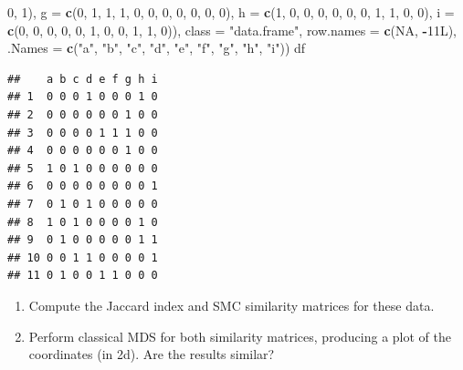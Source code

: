 \documentclass[]{book}
\newenvironment{Shaded}{\begin{snugshade}}{\end{snugshade}}
\newcommand{\DataTypeTok}[1]{\textcolor[rgb]{0.13,0.29,0.53}{#1}}
\newcommand{\DecValTok}[1]{\textcolor[rgb]{0.00,0.00,0.81}{#1}}
\newcommand{\KeywordTok}[1]{\textcolor[rgb]{0.13,0.29,0.53}{\textbf{#1}}}
\newcommand{\NormalTok}[1]{#1}
\newcommand{\OperatorTok}[1]{\textcolor[rgb]{0.81,0.36,0.00}{\textbf{#1}}}
\newcommand{\OtherTok}[1]{\textcolor[rgb]{0.56,0.35,0.01}{#1}}
\newcommand{\StringTok}[1]{\textcolor[rgb]{0.31,0.60,0.02}{#1}}
\theoremstyle{definition}
\theoremstyle{definition}
\theoremstyle{definition}
\theoremstyle{remark}
\begin{document}
\begin{Shaded}
\begin{Highlighting}[]
\DecValTok{0}\NormalTok{, }\DecValTok{1}\NormalTok{), }\DataTypeTok{g =} \KeywordTok{c}\NormalTok{(}\DecValTok{0}\NormalTok{, }\DecValTok{1}\NormalTok{, }\DecValTok{1}\NormalTok{, }\DecValTok{1}\NormalTok{, }\DecValTok{0}\NormalTok{, }\DecValTok{0}\NormalTok{, }\DecValTok{0}\NormalTok{, }\DecValTok{0}\NormalTok{, }\DecValTok{0}\NormalTok{, }\DecValTok{0}\NormalTok{, }\DecValTok{0}\NormalTok{), }\DataTypeTok{h =} \KeywordTok{c}\NormalTok{(}\DecValTok{1}\NormalTok{, }\DecValTok{0}\NormalTok{, }\DecValTok{0}\NormalTok{, }
\DecValTok{0}\NormalTok{, }\DecValTok{0}\NormalTok{, }\DecValTok{0}\NormalTok{, }\DecValTok{0}\NormalTok{, }\DecValTok{1}\NormalTok{, }\DecValTok{1}\NormalTok{, }\DecValTok{0}\NormalTok{, }\DecValTok{0}\NormalTok{), }\DataTypeTok{i =} \KeywordTok{c}\NormalTok{(}\DecValTok{0}\NormalTok{, }\DecValTok{0}\NormalTok{, }\DecValTok{0}\NormalTok{, }\DecValTok{0}\NormalTok{, }\DecValTok{0}\NormalTok{, }\DecValTok{1}\NormalTok{, }\DecValTok{0}\NormalTok{, }\DecValTok{0}\NormalTok{, }\DecValTok{1}\NormalTok{, }\DecValTok{1}\NormalTok{, }
\DecValTok{0}\NormalTok{)), }\DataTypeTok{class =} \StringTok{"data.frame"}\NormalTok{, }\DataTypeTok{row.names =} \KeywordTok{c}\NormalTok{(}\OtherTok{NA}\NormalTok{, }\OperatorTok{-}\NormalTok{11L), }\DataTypeTok{.Names =} \KeywordTok{c}\NormalTok{(}\StringTok{"a"}\NormalTok{, }
\StringTok{"b"}\NormalTok{, }\StringTok{"c"}\NormalTok{, }\StringTok{"d"}\NormalTok{, }\StringTok{"e"}\NormalTok{, }\StringTok{"f"}\NormalTok{, }\StringTok{"g"}\NormalTok{, }\StringTok{"h"}\NormalTok{, }\StringTok{"i"}\NormalTok{))}
\NormalTok{df}
\end{Highlighting}
\end{Shaded}

\begin{verbatim}
##    a b c d e f g h i
## 1  0 0 0 1 0 0 0 1 0
## 2  0 0 0 0 0 0 1 0 0
## 3  0 0 0 0 1 1 1 0 0
## 4  0 0 0 0 0 0 1 0 0
## 5  1 0 1 0 0 0 0 0 0
## 6  0 0 0 0 0 0 0 0 1
## 7  0 1 0 1 0 0 0 0 0
## 8  1 0 1 0 0 0 0 1 0
## 9  0 1 0 0 0 0 0 1 1
## 10 0 0 1 1 0 0 0 0 1
## 11 0 1 0 0 1 1 0 0 0
\end{verbatim}

\begin{enumerate}
\def\labelenumi{\roman{enumi}.}
\item
  Compute the Jaccard index and SMC similarity matrices for these data.
\item
  Perform classical MDS for both similarity matrices, producing a plot of the coordinates (in 2d). Are the results similar?
\end{enumerate}
\end{document}
